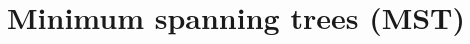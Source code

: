 \documentclass[\main/main.tex]{subfiles}
\begin{document}
\chapter{Minimum spanning trees (MST)}
\end{document}

